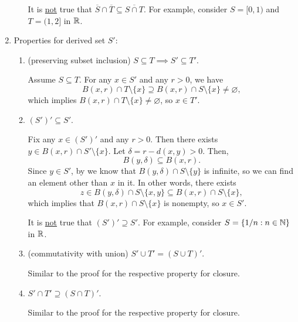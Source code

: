 \begin{enumerate}
\begin{enumerate}
\begin{warning}
It is \underline{not} true that
\(\overline{S}\cap\overline{T}\subseteq\overline{S\cap T}\). For example,
consider \(S=[0,1)\) and \(T=(1,2]\) in \(\mathbb{R}\).
\end{warning}

\end{enumerate}
\item \label{it:deriv-set-prop}
Properties for derived set \(S'\):
\begin{enumerate}
\item \label{it:deriv-pre-subset} (preserving subset inclusion) \(S\subseteq
T\implies S'\subseteq T'\).

\begin{pf}
Assume \(S\subseteq T\).  For any \(x\in S'\) and any \(r>0\), we have
\[
B(x,r)\cap T\setminus \{x\}\supseteq B(x,r)\cap S\setminus \{x\}\ne\varnothing,
\]
which implies \(B(x,r)\cap T\setminus \{x\}\ne\varnothing\), so \(x\in T'\).
\end{pf}
\item \((S')'\subseteq S'\).

\begin{pf}
Fix any \(x\in(S')'\) and any \(r>0\). Then there exists \(y\in B(x,r)\cap
S'\setminus \{x\}\). Let \(\delta=r-d(x,y)>0\). Then,
\[
B(y,\delta)\subseteq B(x,r).
\]
Since \(y\in S'\), by  we know that \(B(y,\delta)\cap
S\setminus \{y\}\) is infinite, so we can find an element other than \(x\) in
it. In other words, there exists
\[
z\in B(y,\delta)\cap S\setminus \{x,y\}
\subseteq B(x,r)\cap S\setminus \{x\},
\]
which implies that \(B(x,r)\cap S\setminus \{x\}\) is nonempty, so \(x\in S'\).
\end{pf}

\begin{warning}
It is \underline{not} true that \((S')'\supseteq S'\). For example, consider
\(S=\{1/n:n\in\mathbb{N}\}\) in \(\mathbb{R}\).
\end{warning}
\item (commutativity with union) \(S'\cup T'=(S\cup T)'\).

\begin{pf}
Similar to the proof for the respective property for closure.
\end{pf}
\item \(S'\cap T'\supseteq (S\cap T)'\).

\begin{pf}
Similar to the proof for the respective property for closure.
\end{pf}


\end{enumerate}
\end{enumerate}
